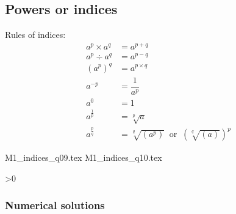 \subsection{Powers or indices}

Rules of indices:
\begin{align}
	a^{p} \times a^{q} 
		&= a^{p+q}	
		\label{eq:indicesR1} 
		\\
	a^{p} \div a^{q} 
		&= a^{p-q} 		
		\label{eq:indicesR2} 
		\\
	(a^{p})^{q} 
		&= a^{p\times q}		
		\label{eq:indicesR3} 
		\\
	a^{-p} 
		&= \dfrac{1}{a^{p}} 			
		\label{eq:indicesR4} 
		\\
	a^{0} 
		&= 1									
		\label{eq:indicesR5} 
		\\
	a^{\frac{1}{p}} 
		&= \sqrt[p]{a}		
		\label{eq:indicesR6} 
		\\
	a^{\frac{p}{q}} 
		& = \sqrt[q]{(a^{p})} 
		\;\; \text{or} \;\; 
		\left( \sqrt[q]{(a)} \right)^{p}	
		\label{eq:indicesR7}
\end{align}

\begin{questions}



\setcounter{question}{8}
{M1_indices_q09.tex}
\newpage
{M1_indices_q10.tex}

\ifnum\value{printSols}>0
	\subsubsection*{Numerical solutions}
	\setcounter{solNo}{2}
	\begin{enumerate}
		\setcounter{enumi}{8}
		\begin{multicols}{6}
			\hlitem \printSolutionAndInc{} %
		\end{multicols}
	\end{enumerate}
	\else
\fi

\end{questions}